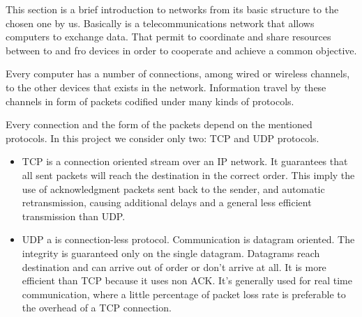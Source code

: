 This section is a brief introduction to networks from its basic structure to the chosen one by us.
Basically is a telecommunications network that allows computers to exchange data. That permit to coordinate and share resources between to and fro devices in order to cooperate and achieve a common objective. 

Every computer has a number of connections, among wired or wireless channels, to the other devices that exists in the network. Information travel by these channels in form of packets codified under many kinds of protocols. 

Every connection and the form of the packets depend on the mentioned protocols. In this project we consider only two: TCP and UDP protocols.

\begin{itemize}
	\item TCP is a connection oriented stream over an IP network. It guarantees that all sent packets will reach the destination in the correct order. This imply the use of acknowledgment packets sent back to the sender, and automatic retransmission, causing additional delays and a general less efficient transmission than UDP.

	\item UDP a is connection-less protocol. Communication is datagram oriented. The integrity is guaranteed only on the single datagram. Datagrams reach destination and can arrive out of order or don't arrive at all. It is more efficient than TCP because it uses non ACK. It's generally used for real time communication, where a little percentage of packet loss rate is preferable to the overhead of a TCP connection.
\end{itemize}


